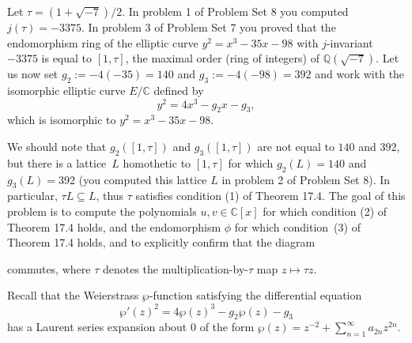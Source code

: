 \documentclass[11pt]{article}
\newcommand{\Q}{\mathbb{Q}}
\newcommand{\C}{\mathbb{C}}
\theoremstyle{definition}
\begin{document}
Let $\tau=(1+\sqrt{-7})/2$.
In problem 1 of Problem Set 8 you computed $j(\tau)=-3375$.
In problem 3 of Problem Set 7 you proved that the endomorphism ring of the elliptic curve $y^2=x^3-35x-98$ with $j$-invariant $-3375$ is equal to $[1,\tau]$, the maximal order (ring of integers) of $\Q(\sqrt{-7})$.
Let us now set $g_2:=-4(-35)=140$ and $g_3:=-4(-98)=392$ and work with the isomorphic elliptic curve $E/\C$ defined by
\[
y^2=4x^3-g_2x-g_3,
\]
which is isomorphic to $y^2=x^3-35x-98$.

We should note that $g_2([1,\tau])$ and $g_3([1,\tau])$ are not equal to $140$ and $392$, but there is a lattice~$L$ homothetic to $[1,\tau]$ for which $g_2(L)=140$ and $g_3(L)=392$ (you computed this lattice $L$ in problem 2 of Problem Set 8).
In particular, $\tau L\subseteq L$, thus $\tau$ satisfies condition (1) of Theorem 17.4.
The goal of this problem is to compute the polynomials $u,v\in\C[x]$ for which condition (2) of Theorem 17.4 holds, and the endomorphism $\phi$ for which condition~(3) of Theorem 17.4 holds, and to explicitly confirm that the diagram
\begin{center}
\end{center}
commutes, where $\tau$ denotes the multiplication-by-$\tau$ map $z\mapsto \tau z$.

Recall that the Weierstrass $\wp$-function satisfying the differential equation
\begin{equation}\label{eq:wp}
\wp'(z)^2 = 4\wp(z)^3 - g_2\wp(z) - g_3
\end{equation}
has a Laurent series expansion about 0 of the form $\wp(z) = z^{-2} +\sum_{n=1}^\infty a_{2n}z^{2n}$.
\end{document}
